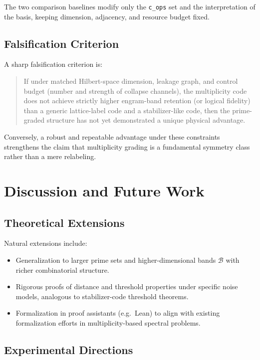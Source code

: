 \documentclass[11pt]{article}
\begin{document}
The two comparison baselines modify only the \texttt{c\_ops} set and the
interpretation of the basis, keeping dimension, adjacency, and resource
budget fixed.

\subsection{Falsification Criterion}

A sharp falsification criterion is:

\begin{quote}
If under matched Hilbert-space dimension, leakage graph, and control budget
(number and strength of collapse channels), the multiplicity code does not
achieve strictly higher engram-band retention (or logical fidelity) than a
generic lattice-label code and a stabilizer-like code, then the prime-graded
structure has not yet demonstrated a unique physical advantage.
\end{quote}

Conversely, a robust and repeatable advantage under these constraints
strengthens the claim that multiplicity grading is a fundamental symmetry
class rather than a mere relabeling.

\section{Discussion and Future Work}

\subsection{Theoretical Extensions}

Natural extensions include:
\begin{itemize}[leftmargin=*]
  \item Generalization to larger prime sets and higher-dimensional bands
        $\mathcal B$ with richer combinatorial structure.
  \item Rigorous proofs of distance and threshold properties under specific
        noise models, analogous to stabilizer-code threshold theorems.
  \item Formalization in proof assistants (e.g.\ Lean) to align with existing
        formalization efforts in multiplicity-based spectral problems.
\end{itemize}

\subsection{Experimental Directions}
\end{document}
